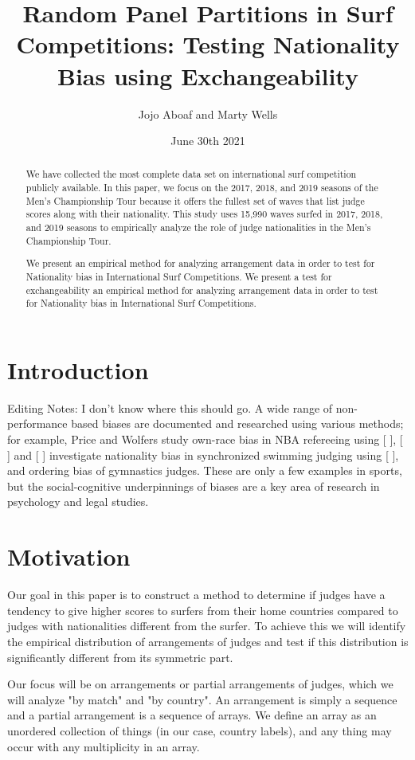 \documentclass{article}
\title{Random Panel Partitions in Surf Competitions: Testing Nationality Bias using Exchangeability }
\author{Jojo Aboaf and Marty Wells}
\date{June 30th 2021}
\begin{document}
\maketitle
\tableofcontents

\begin{abstract}
We have collected the most complete data set on international surf competition publicly available.
In this paper, we focus on the 2017, 2018, and 2019 seasons of the Men’s Championship Tour because it offers the fullest set of waves that list judge scores along with their nationality. This study uses 15,990 waves surfed in 2017, 2018, and 2019 seasons to empirically analyze the role of judge nationalities in the Men's Championship Tour.

We present an empirical method for analyzing arrangement data in order to test for Nationality bias in International Surf Competitions. 
We present a test for exchangeability  an empirical method for analyzing arrangement data in order to test for Nationality bias in International Surf Competitions. 

\end{abstract}
\section{Introduction}
Editing Notes: I don't know where this should go.
A wide range of non-performance based biases are documented and researched using various methods; for example, Price and Wolfers study own-race bias in NBA refereeing using [        ], [   ] and [  ] investigate nationality bias in synchronized swimming judging using [       ], and ordering bias of gymnastics judges. These are only a few examples in sports, but the social-cognitive underpinnings of biases are a key area of research in psychology and legal studies.

\section{Motivation}
Our goal in this paper is to construct a method to determine if judges have a tendency to give higher scores to surfers from their home countries compared to judges with nationalities different from the surfer. To achieve this we will identify the empirical distribution of arrangements of judges and test if this distribution is significantly different from its symmetric part.

Our focus will be on arrangements or partial arrangements of judges, which we will analyze "by match" and "by country". An arrangement is simply a sequence and a partial arrangement is a sequence of arrays. We define an array as an unordered collection of things (in our case, country labels), and any thing may occur with any multiplicity in an array.
\end{document}
